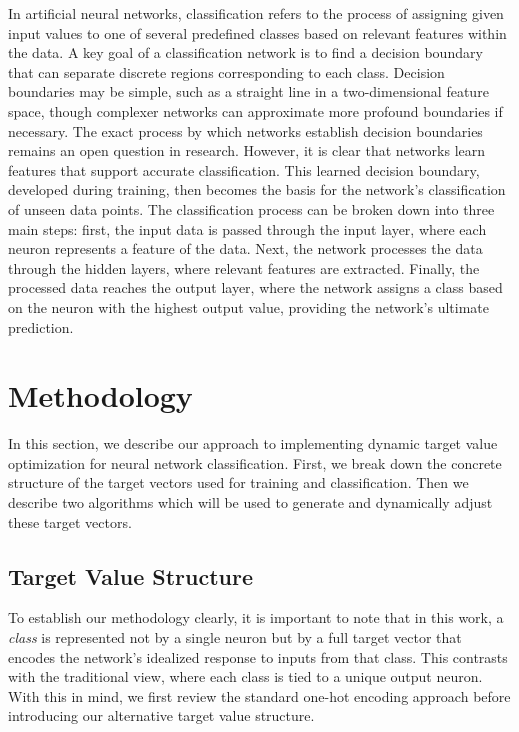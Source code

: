 \documentclass[12pt,fleqn,a4paper]{article}
\begin{document}
In artificial neural networks, classification refers to the process of assigning given input values to one of several predefined classes based on relevant features within the data. A key goal of a classification network is to find a decision boundary that can separate discrete regions corresponding to each class. Decision boundaries may be simple, such as a straight line in a two-dimensional feature space, though complexer networks can approximate more profound boundaries if necessary. The exact process by which networks establish decision boundaries remains an open question in research. However, it is clear that networks learn features that support accurate classification. This learned decision boundary, developed during training, then becomes the basis for the network's classification of unseen data points. The classification process can be broken down into three main steps: first, the input data is passed through the input layer, where each neuron represents a feature of the data. Next, the network processes the data through the hidden layers, where relevant features are extracted. Finally, the processed data reaches the output layer, where the network assigns a class based on the neuron with the highest output value, providing the network's ultimate prediction.


\section{Methodology}
In this section, we describe our approach to implementing dynamic target value optimization for neural network classification. First, we break down the concrete structure of the target vectors used for training and classification. Then we describe two algorithms which will be used to generate and dynamically adjust these target vectors.

\subsection{Target Value Structure}\label{sec:targets}

To establish our methodology clearly, it is important to note that in this work, a \textit{class} is represented not by a single neuron but by a full target vector that encodes the network's idealized response to inputs from that class. This contrasts with the traditional view, where each class is tied to a unique output neuron. With this in mind, we first review the standard one-hot encoding approach before introducing our alternative target value structure.
\end{document}
